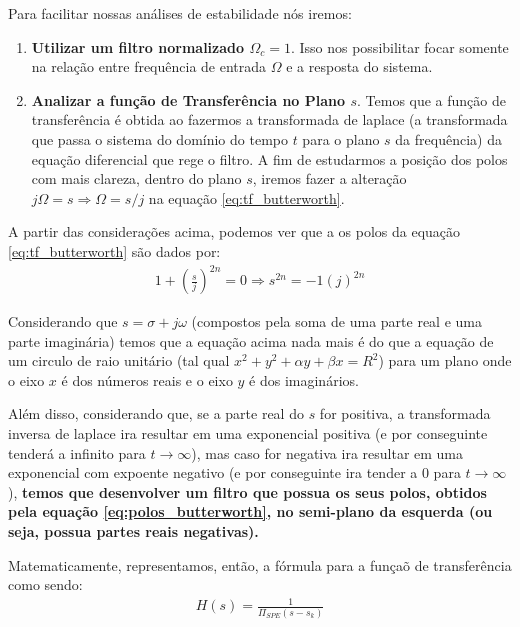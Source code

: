 \documentclass{article}
\begin{document}
Para facilitar nossas análises de estabilidade nós iremos:
\begin{enumerate}
    \item \textbf{Utilizar um filtro normalizado $\Omega_c = 1$}. Isso nos possibilitar focar somente na relação entre frequência de entrada $\Omega$ e a resposta do sistema.
    \item \textbf{Analizar a função de Transferência no Plano $s$}. Temos que a função de transferência é obtida ao fazermos a transformada de laplace (a transformada que passa o sistema do domínio do tempo $t$ para o plano $s$ da frequência) da equação diferencial que rege o filtro. A fim de estudarmos a posição dos polos com mais clareza, dentro do plano $s$, iremos fazer a alteração $j\Omega = s \Rightarrow \Omega = s/j$ na equação \ref{eq:tf_butterworth}.

\end{enumerate}

    A partir das considerações acima, podemos ver que a os polos da equação \ref{eq:tf_butterworth} são dados por:
    \begin{align}
        1 + \left(\frac{s}{j}\right)^{2n} = 0 \Rightarrow s^{2n} = -1(j)^{2n}
        \label{eq:polos_butterworth}
    \end{align}

    Considerando que $s = \sigma + j\omega$ (compostos pela soma de uma parte real e uma parte imaginária) temos que a equação acima nada mais é do que a equação de um circulo de raio unitário (tal qual $x^2 + y^2 + \alpha y + \beta x = R^2$) para um plano onde o eixo $x$ é dos números reais e o eixo $y$ é dos imaginários.

    Além disso, considerando que, se a parte real do $s$ for positiva, a transformada inversa de laplace ira resultar em uma exponencial positiva (e por conseguinte tenderá a infinito para $t \rightarrow \infty$), mas caso for negativa ira resultar em uma exponencial com expoente negativo (e por conseguinte ira tender a $0$ para $t\rightarrow \infty$), \textbf{temos que desenvolver um filtro que possua os seus polos, obtidos pela equação \ref{eq:polos_butterworth}, no semi-plano da esquerda (ou seja, possua partes reais negativas).}

    Matematicamente, representamos, então, a fórmula para a funçaõ de transferência como sendo:
    \begin{align}
        H(s) = \frac{1}{\Pi_{SPE} (s - s_k)}
    \end{align}
\end{document}
